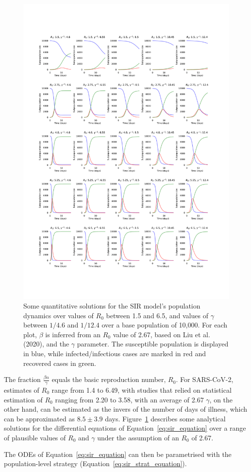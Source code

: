 \documentclass{article}
\begin{document}
\begin{figure}
	\includegraphics[width=\linewidth]{figures/fig1-odes}
	\caption{Some quantitative solutions for the SIR model's population dynamics over values of $R_0$ between 1.5 and 6.5, and values of $\gamma$ between $1/4.6$ and $1/12.4$ over a base population of 10,000. For each plot, $\beta$ is inferred from an $R_0$ value of 2.67, based on Liu et al. (2020),\cite{liu2020reproductive} and the $\gamma$ parameter. The susceptible population is displayed in blue, while infected/infectious cases are marked in red and recovered cases in green.}
	\label{fig:ode_solutions}
\end{figure}

The fraction $\frac{\beta n}{\gamma}$ equals the basic reproduction number, $R_0$. For SARS-CoV-2, estimates of $R_0$ range from 1.4 to 6.49, with studies that relied on statistical estimation of $R_0$ ranging from 2.20 to 3.58, with an average of 2.67\cite{liu2020reproductive} $\gamma$, on the other hand, can be estimated as the invers of the number of days of illness, which can be approximated as $8.5 \pm 3.9$ days. Figure~\ref{fig:ode_solutions} describes some analytical solutions for the differential equations of Equation~\eqref{eq:sir_equation} over a range of plausible values of $R_0$ and $\gamma$ under the assumption of an $R_0$ of 2.67.

The ODEs of Equation~\eqref{eq:sir_equation} can then be parametrised with the population-level strategy (Equation~\eqref{eq:sir_strat_equation}). 



\end{document}
